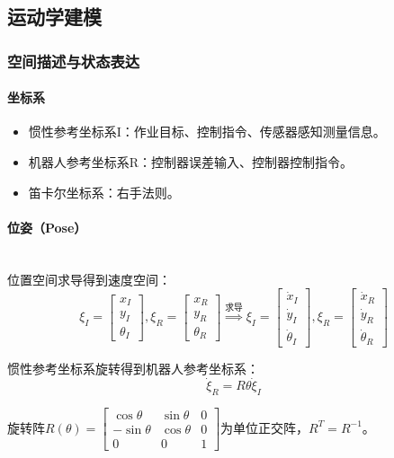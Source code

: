 \documentclass[
12pt, %
a4paper, 
oneside, %
headinclude,footinclude, %
]{scrartcl}
\begin{document}
\subsection[运动学建模]{运动学建模}
\subsubsection[空间描述与状态表达]{空间描述与状态表达}
\paragraph{坐标系}
\begin{itemize}
\item 惯性参考坐标系I：作业目标、控制指令、传感器感知测量信息。
\item 机器人参考坐标系R：控制器误差输入、控制器控制指令。
\item 笛卡尔坐标系：右手法则。
\end{itemize}
\paragraph{位姿（Pose）}~\\

位置空间求导得到速度空间：
$$
\xi_I = \begin{bmatrix} x_I \\ y_I \\ \theta_I \end{bmatrix}, 
\xi_R = \begin{bmatrix} x_R \\ y_R \\ \theta_R \end{bmatrix}
\overset{\text{求导}}{\Longrightarrow}
\xi_I = \begin{bmatrix} \dot{x}_I \\ \dot{y}_I \\ \dot{\theta}_I \end{bmatrix},
\xi_R = \begin{bmatrix} \dot{x}_R \\ \dot{y}_R \\ \dot{\theta}_R \end{bmatrix}
$$

惯性参考坐标系旋转得到机器人参考坐标系：
$$ \dot{\xi}_R = R\theta \dot{\xi}_I $$

旋转阵$ R(\theta) = \begin{bmatrix} \cos\theta & \sin\theta & 0 \\ -\sin\theta & \cos\theta & 0 \\ 0 & 0 & 1 \end{bmatrix} $为单位正交阵，$ R^T = R^{-1} $。
\end{document}
